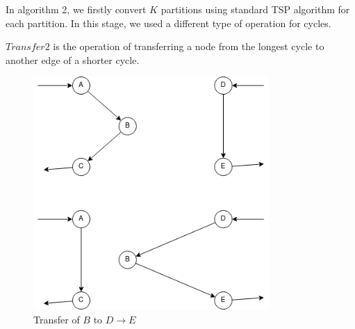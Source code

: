 
In algorithm 2, we firstly convert $K$ partitions using standard TSP algorithm for each partition. In this stage, we used a different type of operation for cycles.

$Transfer2$ is the operation of transferring a node from the longest cycle to another edge of a shorter cycle.

\begin{figure}[h!]
\centering
\includegraphics[width=0.8\textwidth]{assets/transfer2.png}
\caption{Transfer of $B$ to $D \to E$}
\label{fig:transfer2}
\end{figure}


